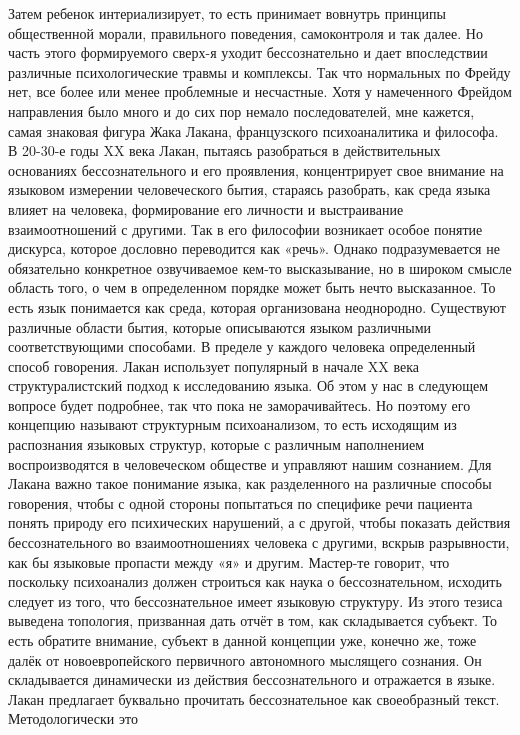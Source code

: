 Затем ребенок интериализирует, то есть принимает вовнутрь принципы общественной
морали, правильного поведения, самоконтроля и так далее. Но часть этого
формируемого сверх-я уходит бессознательно и дает впоследствии различные
психологические травмы и комплексы. Так что нормальных по Фрейду нет, все более
или менее проблемные и несчастные. Хотя у намеченного Фрейдом направления было
много и до сих пор немало последователей, мне кажется, самая знаковая фигура
Жака Лакана, французского психоаналитика и философа. В 20-30-е годы XX века
Лакан, пытаясь разобраться в действительных основаниях бессознательного и его
проявления, концентрирует свое внимание на языковом измерении человеческого
бытия, стараясь разобрать, как среда языка влияет на человека, формирование его
личности и выстраивание взаимоотношений с другими. Так в его философии возникает
особое понятие дискурса, которое дословно переводится как «речь». Однако
подразумевается не обязательно конкретное озвучиваемое кем-то высказывание, но в
широком смысле область того, о чем в определенном порядке может быть нечто
высказанное. То есть язык понимается как среда, которая организована
неоднородно. Существуют различные области бытия, которые описываются языком
различными соответствующими способами. В пределе у каждого человека определенный
способ говорения. Лакан использует популярный в начале XX века структуралистский
подход к исследованию языка. Об этом у нас в следующем вопросе будет подробнее,
так что пока не заморачивайтесь. Но поэтому его концепцию называют структурным
психоанализом, то есть исходящим из распознания языковых структур, которые с
различным наполнением воспроизводятся в человеческом обществе и управляют нашим
сознанием. Для Лакана важно такое понимание языка, как разделенного на различные
способы говорения, чтобы с одной стороны попытаться по специфике речи пациента
понять природу его психических нарушений, а с другой, чтобы показать действия
бессознательного во взаимоотношениях человека с другими, вскрыв разрывности, как
бы языковые пропасти между «я» и другим. Мастер-те говорит, что поскольку
психоанализ должен строиться как наука о бессознательном, исходить следует из
того, что бессознательное имеет языковую структуру. Из этого тезиса выведена
топология, призванная дать отчёт в том, как складывается субъект. То есть
обратите внимание, субъект в данной концепции уже, конечно же, тоже далёк от
новоевропейского первичного автономного мыслящего сознания. Он складывается
динамически из действия бессознательного и отражается в языке. Лакан предлагает
буквально прочитать бессознательное как своеобразный текст. Методологически это
